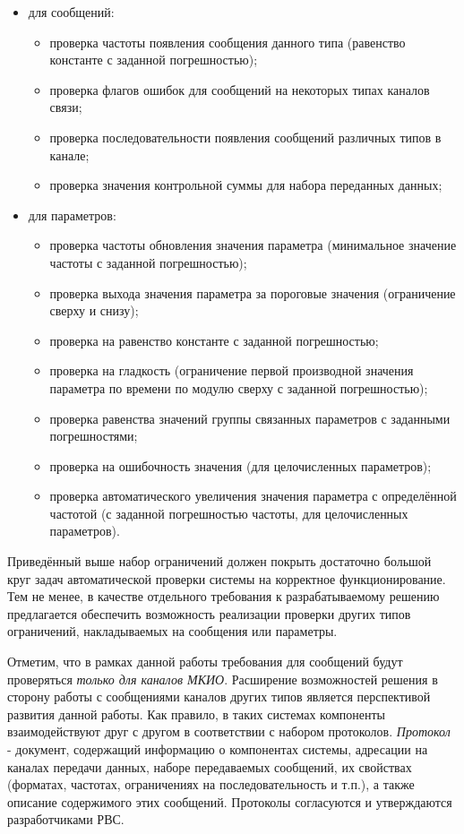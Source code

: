 \begin{itemize}
 \item для сообщений:
 \begin{itemize}
  \item проверка частоты появления сообщения данного типа (равенство константе 
с заданной погрешностью);
  \item проверка флагов ошибок для сообщений на некоторых типах каналов связи;
  \item проверка последовательности появления сообщений различных типов в 
канале;
  \item проверка значения контрольной суммы для набора переданных данных;
 \end{itemize}
 \item для параметров:
 \begin{itemize}
  \item проверка частоты обновления значения параметра (минимальное значение 
частоты с заданной погрешностью);
  \item проверка выхода значения параметра за пороговые значения (ограничение 
сверху и снизу);
  \item проверка на равенство константе с заданной погрешностью;
  \item проверка на гладкость (ограничение первой производной значения 
параметра по времени по модулю сверху с заданной погрешностью);
  \item проверка равенства значений группы связанных параметров с заданными 
погрешностями;
  \item проверка на ошибочность значения (для целочисленных параметров);
  \item проверка автоматического увеличения значения параметра с определённой 
частотой (с заданной погрешностью частоты, для целочисленных параметров).
 \end{itemize}
\end{itemize}

Приведённый выше набор ограничений должен покрыть достаточно большой круг задач 
автоматической проверки системы на корректное функционирование. Тем не менее, 
в качестве отдельного требования к разрабатываемому решению предлагается 
обеспечить возможность реализации проверки других типов ограничений, 
накладываемых на сообщения или параметры.

Отметим, что в рамках данной работы требования для сообщений будут проверяться 
\textit{только для каналов МКИО}. Расширение возможностей решения в сторону 
работы с сообщениями каналов других типов является перспективой развития данной 
работы.
\iffalse
Как правило, в таких системах компоненты взаимодействуют друг с другом в 
соответствии с набором протоколов. \textit{Протокол} - документ, содержащий 
информацию о компонентах системы, адресации на каналах передачи данных, наборе 
передаваемых сообщений, их свойствах (форматах, частотах, ограничениях на 
последовательность и т.п.), а также описание содержимого этих сообщений. 
Протоколы согласуются и утверждаются разработчиками РВС.

